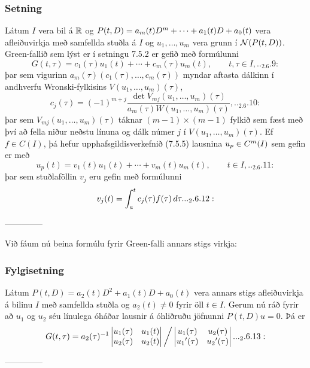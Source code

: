 \subsubsection{Setning}
Látum $I$ vera bil á ${\mathbb R}$ og $P(t,D)=a_m(t)D\sp m+\cdots+a_1(t)D+a_0(t)$
vera afleiðuvirkja með
samfellda stuðla á $I$ og $u_1,\dots,u_m$ vera grunn í ${\cal N}(P(t,D))$. 
Green-fallið sem lýst er í setningu 7.5.2
er gefið með formúlunni
 \begin{equation*}G(t,\tau)=c_1(\tau)u_1(t)+\cdots+c_m(\tau)u_m(t), \qquad t,\tau\in I,


.. _2.6.9:

 \end{equation*}
þar sem vigurinn $a_m({\tau})(c_1(\tau),\dots,c_m(\tau))$ myndar aftasta dálkinn
í andhverfu Wronski-fylkisins $V(u_1,\dots,u_m)(\tau)$,
 \begin{equation*}c_j(\tau)=(-1)^{m+j} \dfrac{\det V_{mj}(u_1,\dots,u_m)(\tau)}
{a_m({\tau})W(u_1,\dots, u_m)(\tau)},


.. _2.6.10:

 \end{equation*}
þar sem $V_{mj}(u_1,\dots,u_m)(\tau)$ táknar $(m-1)\times (m-1)$
fylkið sem fæst með því að fella niður neðstu línuna og dálk númer
$j$ í $V(u_1,\dots,u_m)(\tau)$.    Ef $f\in
C(I)$, þá hefur upphafsgildisverkefnið (7.5.5) lausnina $u_p\in C\sp
m(I)$  sem
gefin er með
 \begin{equation*}u_p(t)=v_1(t)u_1(t)+\cdots+v_m(t)u_m(t), \qquad t\in I,

.. _2.6.11:

 \end{equation*}
þar sem stuðlaföllin $v_j$ eru gefin með formúlunni
 \begin{equation*}v_j(t)=\int_a\sp t c_j(\tau)f(\tau) \, d\tau.

.. _2.6.12:

 \end{equation*}


--------------




Við fáum nú beina formúlu fyrir Green-falli annars stigs virkja:

\subsubsection{Fylgisetning} Látum $P(t,D)=a_2(t)D^2+a_1(t)D+a_0(t)$ vera annars stigs
afleiðuvirkja á bilinu $I$ með samfellda stuðla og $a_2(t)\neq 0$ fyrir
öll $t\in I$. Gerum nú ráð fyrir að $u_1$ og $u_2$ séu línulega óháðar 
lausnir á óhliðruðu jöfnunni $P(t,D)u=0$.  Þá er 
\begin{equation*}
G(t,\tau) 
=a_2(\tau)^{-1}
\left|\begin{matrix}
u_1(\tau) & u_1(t)\\
u_2(\tau) & u_2(t)
\end{matrix}\right|\bigg /
\left|\begin{matrix}
u_1(\tau) & u_2({\tau})\\
u_1\dash(\tau) & u_2\dash({\tau})
\end{matrix}\right|.


.. _2.6.13:

\end{equation*}


--------------


